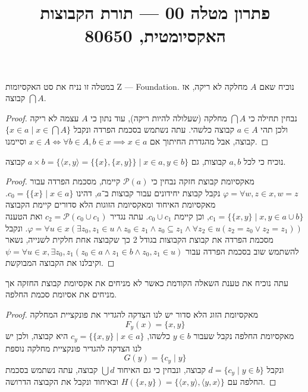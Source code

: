 
\title{פתרון מטלה 00 --- תורת הקבוצות האקסיומטית, 80650}


\maketitle
\maketitleprint{}

במטלה זו נניח את סט האקסיומות Z --- Foundation.
\Question{}
נוכיח שאם $A$ מחלקה לא ריקה, אז $\bigcap A$ קבוצה.
\begin{proof}
	נבחין תחילה כי $\bigcap A$ מחלקה (שעלולה להיות ריקה), עוד נתון כי $A$ עצמה לא ריקה ולכן תהי $a \in A$ קבוצה כלשהי.
	עתה נשתמש בסכמת הפרדה ונקבל $\{ x \in a \mid x \in \bigcap A \}$ קבוצה, אבל מהגדרת החיתוך אם $x \in A \iff \forall b \in A, b \in x \implies x \in a$ וסיימנו.
\end{proof}

\Question{}
נוכיח כי לכל $a, b$ קבוצות, גם $a \times b = \{ \langle x, y \rangle = \{ \{ x \}, \{ x, y \}\} \mid x \in a, y \in b \}$ קבוצה.
\begin{proof}
	מאקסיומת קבוצת חזקה נבחין כי $\mathcal{P}(a)$ קיימת, מסכמת הפרדה עבור $\varphi = \forall w, z \in x, w = z$ נקבל קבוצת יחידונים עבור קבוצות ב־$a$, דהינו $c_0 = \{ \{ x \} \mid x \in a \}$.
	מאקסיומת האיחוד ומאקסיומת הזוגות הלא סדורים קיימת הקבוצה $c_1 = \{ \{x, y \} \mid x, y \in a \cup b \}$, וכן קיימת $c_0 \cup c_1$.
	עתה נגדיר $c_2 = \mathcal{P}(c_0 \cup c_1)$ ואת הטענה $\varphi = \forall u \in x (\exists z_0, z_1 \in u \land z_0 \in z_1 \land z_0 \subseteq z_1 \land \forall z_2 \in u (z_2 = z_0 \lor z_2 = z_1))$.
	ונקבל מסכמת הפרדה את קבוצת הקבוצות בגודל 2 כך שקבוצה אחת חלקית לשנייה, נשאר להשתמש שוב בסכמת הפרדה עבור $\psi = \forall u \in x, \exists z_0, z_1 (z_0 \in a \land z_1 \in b \land z_0, z_1 \in u )$
	וקיבלנו את הקבוצה המבוקשת.
\end{proof}

\Question{}
עתה נוכיח את טענת השאלה הקודמת כאשר לא מניחים את אקסיומת קבוצת החזקה אך מניחים את אסיומת סכמת החלפה.
\begin{proof}
	מאקסיומת הזוג הלא סדור יש לנו הצדקה להגדיר את פונקציית המחלקה
	\[
		F_y(x) = \{ x, y \}
	\]
	מאקסיומת החלפה נקבל שעבור $y \in b$ כלשהו, $c_y = \{ \{x, y \} \mid x \in a \}$ היא קבוצה, ולכן יש לנו הצדקה להגדיר פונקציית מחלקה נוספת
	\[
		G(y) = \{ c_y \mid y \}
	\]
	ונקבל $d = \{ c_y \mid y \in b \}$ קבוצה, ונבחין כי גם האיחוד $\bigcup d$ קבוצה, עתה נשתמש בסכמת החלפה עם $H(\{x, y\}) = \{ \langle x, y \rangle, \langle y, x\rangle \}$ ובאיחוד ונקבל את הקבוצה הדרושה.
\end{proof}


